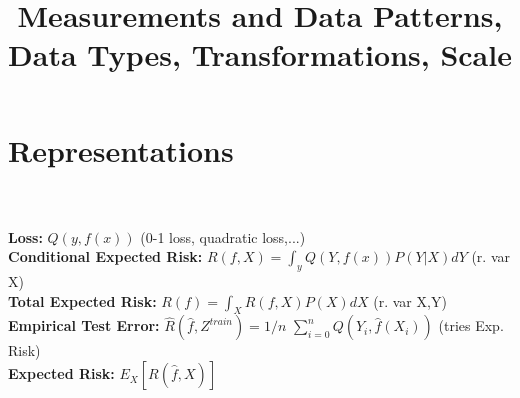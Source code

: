 \section{Representations} \title{Measurements and Data Patterns, Data Types, Transformations, Scale}\\
\\
\textbf{Loss: }$Q(y, f(x))$ (0-1 loss, quadratic loss,...)\\
\textbf{Conditional Expected Risk: }$R(f,X) = \int_{y}^{} Q(Y,f(x))P(Y|X)dY$ (r. var X)\\
\textbf{Total Expected Risk: }$R(f)= \int_{X}^{} R(f,X)P(X)dX$ (r. var X,Y)\\
\textbf{Empirical Test Error: }$\hat{R}(\hat{f},Z^{train}) = 1/n$ $\sum_{i=0}^{n}Q(Y_{i},\hat{f}(X_{i}))$ (tries \rightarrow Exp. Risk)\\
\textbf{Expected Risk: }$E_{X}[R(\hat{f},X)]$

